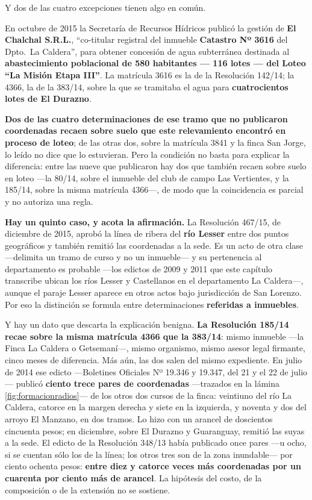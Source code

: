 \begin{cautela}
Y dos de las cuatro excepciones tienen algo en común.

En octubre de 2015 la Secretaría de Recursos Hídricos publicó la gestión de \textbf{El Chalchal S.R.L.}, ``co-titular registral del inmueble \textbf{Catastro Nº 3616} del Dpto.\ La Caldera'', para obtener concesión de agua subterránea destinada al \textbf{abastecimiento poblacional de 580 habitantes --- 116 lotes --- del Loteo ``La Misión Etapa III''}. La matrícula 3616 es la de la Resolución 142/14; la 4366, la de la 383/14, sobre la que se tramitaba el agua para \textbf{cuatrocientos lotes de El Durazno}.

\textbf{Dos de las cuatro determinaciones de ese tramo que no publicaron coordenadas recaen sobre suelo que este relevamiento encontró en proceso de loteo}; de las otras dos, sobre la matrícula 3841 y la finca San Jorge, lo leído no dice que lo estuvieran. Pero la condición no basta para explicar la diferencia: entre las nueve que publicaron hay dos que también recaen sobre suelo en loteo ---la 80/14, sobre el inmueble del club de campo Las Vertientes, y la 185/14, sobre la misma matrícula 4366---, de modo que la coincidencia es parcial y no autoriza una regla.

\textbf{Hay un quinto caso, y acota la afirmación.} La Resolución 467/15, de diciembre de 2015, aprobó la línea de ribera del \textbf{río Lesser} entre dos puntos geográficos y también remitió las coordenadas a la sede. Es un acto de otra clase ---delimita un tramo de curso y no un inmueble--- y su pertenencia al departamento es probable ---los edictos de 2009 y 2011 que este capítulo transcribe ubican los ríos Lesser y Castellanos en el departamento La Caldera---, aunque el paraje Lesser aparece en otros actos bajo jurisdicción de San Lorenzo. Por eso la distinción se formula entre determinaciones \textbf{referidas a inmuebles}.

Y hay un dato que descarta la explicación benigna. \textbf{La Resolución 185/14 recae sobre la misma matrícula 4366 que la 383/14}: mismo inmueble ---la Finca La Caldera o Getsemaní---, mismo organismo, mismo asesor legal firmante, cinco meses de diferencia. Más aún, las dos salen del mismo expediente. En julio de 2014 ese edicto ---Boletines Oficiales Nº 19.346 y 19.347, del 21 y el 22 de julio--- publicó \textbf{ciento trece pares de coordenadas} ---trazados en la lámina \ref{fig:formacionradios}--- de los otros dos cursos de la finca: veintiuno del río La Caldera, catorce en la margen derecha y siete en la izquierda, y noventa y dos del arroyo El Manzano, en dos tramos. Lo hizo con un arancel de doscientos cincuenta pesos; en diciembre, sobre El Durazno y Guaranguay, remitió las suyas a la sede. El edicto de la Resolución 348/13 había publicado once pares ---u ocho, si se cuentan sólo los de la línea; los otros tres son de la zona inundable--- por ciento ochenta pesos: \textbf{entre diez y catorce veces más coordenadas por un cuarenta por ciento más de arancel}. La hipótesis del costo, de la composición o de la extensión no se sostiene.


\end{cautela}
